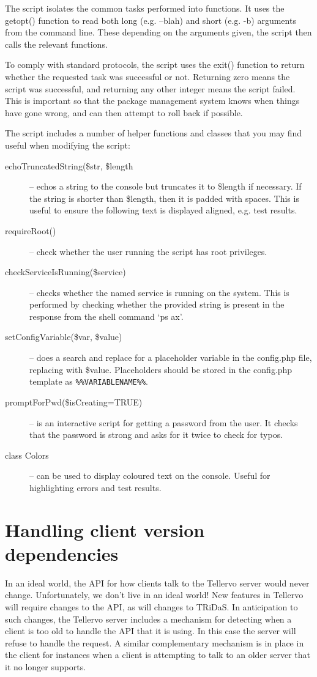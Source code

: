 The script isolates the common tasks performed into functions.  It uses the getopt() function to read both long (e.g. --blah) and short (e.g. -b) arguments from the command line.  These depending on the arguments given, the script then calls the relevant functions.

To comply with standard protocols, the script uses the exit() function to return whether the requested task was successful or not.  Returning zero means the script was successful, and returning any other integer means the script failed.  This is important so that the package management system knows when things have gone wrong, and can then attempt to roll back if possible.

The script includes a number of helper functions and classes that you may find useful when modifying the script:

\begin{description}
 \item[echoTruncatedString(\$str, \$length] -- echos a string to the console but truncates it to \$length if necessary.  If the string is shorter than \$length, then it is padded with spaces.  This is useful to ensure the following text is displayed aligned, e.g. test results.
 \item[requireRoot()] -- check whether the user running the script has root privileges.
 \item[checkServiceIsRunning(\$service)] -- checks whether the named service is running on the system.  This is performed by checking whether the provided string is present in the response from the shell command `ps ax'.
 \item[setConfigVariable(\$var, \$value)] -- does a search and replace for a placeholder variable in the config.php file, replacing with \$value.  Placeholders should be stored in the config.php template as \verb|%%VARIABLENAME%%|.
 \item[promptForPwd(\$isCreating=TRUE)] -- is an interactive script for getting a password from the user.  It checks that the password
 is strong and asks for it twice to check for typos. 
 \item[class Colors] -- can be used to display coloured text on the console.  Useful for highlighting errors and test results.

\end{description}

\section{Handling client version dependencies}
In an ideal world, the API for how clients talk to the Tellervo server would never change.  Unfortunately, we don't live in an ideal world!  New features in Tellervo will require changes to the API, as will changes to TRiDaS.  In anticipation to such changes, the Tellervo server includes a mechanism for detecting when a client is too old to handle the API that it is using.  In this case the server will refuse to handle the request.  A similar complementary mechanism is in place in the client for instances when a client is attempting to talk to an older server that it no longer supports.  

